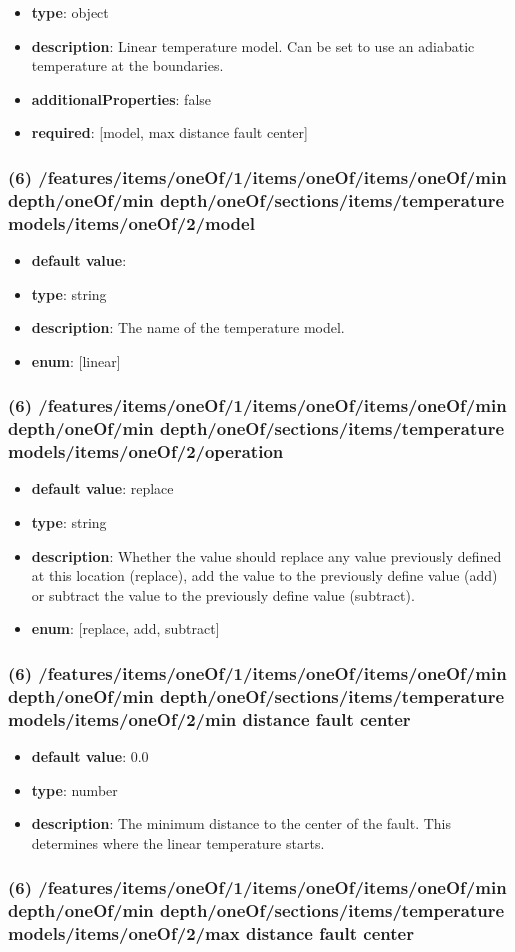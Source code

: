 \begin{itemize}[leftmargin=5em]\item {\bf type}: object
\item {\bf description}: Linear temperature model. Can be set to use an adiabatic temperature at the boundaries.
\item {\bf additionalProperties}: false
\item {\bf required}: [model, max distance fault center]\end{itemize}
\subsubsection{(6) /features/items/oneOf/1/items/oneOf/items/oneOf/min depth/oneOf/min depth/oneOf/sections/items/temperature models/items/oneOf/2/model}
\begin{itemize}[leftmargin=6em]\item {\bf default value}: 
\item {\bf type}: string
\item {\bf description}: The name of the temperature model.
\item {\bf enum}: [linear]\end{itemize}\subsubsection{(6) /features/items/oneOf/1/items/oneOf/items/oneOf/min depth/oneOf/min depth/oneOf/sections/items/temperature models/items/oneOf/2/operation}
\begin{itemize}[leftmargin=6em]\item {\bf default value}: replace
\item {\bf type}: string
\item {\bf description}: Whether the value should replace any value previously defined at this location (replace), add the value to the previously define value (add) or subtract the value to the previously define value (subtract).
\item {\bf enum}: [replace, add, subtract]\end{itemize}\subsubsection{(6) /features/items/oneOf/1/items/oneOf/items/oneOf/min depth/oneOf/min depth/oneOf/sections/items/temperature models/items/oneOf/2/min distance fault center}
\begin{itemize}[leftmargin=6em]\item {\bf default value}: 0.0
\item {\bf type}: number
\item {\bf description}: The minimum distance to the center of the fault. This determines where the linear temperature starts.
\end{itemize}\subsubsection{(6) /features/items/oneOf/1/items/oneOf/items/oneOf/min depth/oneOf/min depth/oneOf/sections/items/temperature models/items/oneOf/2/max distance fault center}
